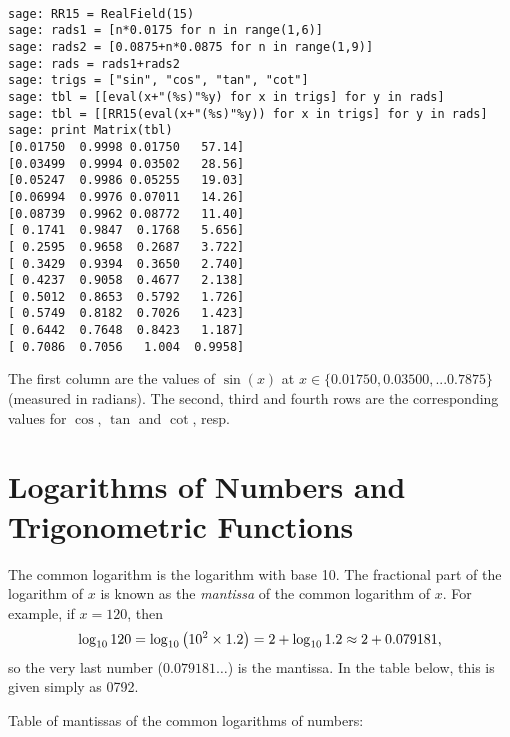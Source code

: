 \begin{Verbatim}[fontsize=\scriptsize,fontfamily=courier,fontshape=tt,frame=single,label=\SAGE]

sage: RR15 = RealField(15)
sage: rads1 = [n*0.0175 for n in range(1,6)]
sage: rads2 = [0.0875+n*0.0875 for n in range(1,9)]
sage: rads = rads1+rads2
sage: trigs = ["sin", "cos", "tan", "cot"]
sage: tbl = [[eval(x+"(%s)"%y) for x in trigs] for y in rads]
sage: tbl = [[RR15(eval(x+"(%s)"%y)) for x in trigs] for y in rads]
sage: print Matrix(tbl)
[0.01750  0.9998 0.01750   57.14]
[0.03499  0.9994 0.03502   28.56]
[0.05247  0.9986 0.05255   19.03]
[0.06994  0.9976 0.07011   14.26]
[0.08739  0.9962 0.08772   11.40]
[ 0.1741  0.9847  0.1768   5.656]
[ 0.2595  0.9658  0.2687   3.722]
[ 0.3429  0.9394  0.3650   2.740]
[ 0.4237  0.9058  0.4677   2.138]
[ 0.5012  0.8653  0.5792   1.726]
[ 0.5749  0.8182  0.7026   1.423]
[ 0.6442  0.7648  0.8423   1.187]
[ 0.7086  0.7056   1.004  0.9958]

\end{Verbatim}

\noindent
The first column are the values of $\sin(x)$ at 
$x\in \{0.01750, 0.03500, ... %
0.7875\}$ (measured in radians). The second, third and fourth 
rows are the corresponding values for $\cos$, $\tan$ and $\cot$,
resp.

\section{Logarithms of Numbers and Trigonometric Functions}
\label{sec:01:05}

The common logarithm is the logarithm with base 10. The fractional part of the logarithm of $x$ is known as the \emph{mantissa} of the common logarithm of $x$. For example, if $x=120$, then
\[
\log_{10}120 = \log_{10}\left(10^2 \times 1.2\right) = 2 + \log_{10}1.2 \approx 2 + 0.079181\textnormal{,}
\]
so the very last number ($0.079181\ldots$) is the mantissa. In the table below, this is given simply as 0792.

Table of mantissas of the common logarithms of numbers:

